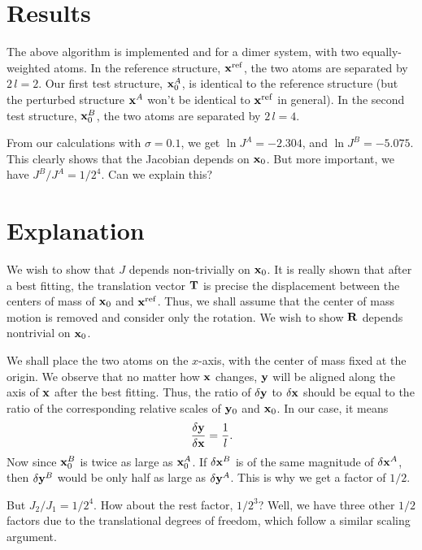 \documentclass[12pt]{article}
\begin{document}
\section{Results}



The above algorithm is implemented and for a dimer system,
with two equally-weighted atoms.
%
In the reference structure, $\mathbf{x}^\mathrm{ref}$,
the two atoms are separated by $2 \, l = 2$.
%
Our first test structure, $\mathbf{x}_0^A$,
is identical to the reference structure
(but the perturbed structure $\mathbf{x}^A$
won't be identical to $\mathbf{x}^\mathrm{ref}$ in general).
%
In the second test structure, $\mathbf{x}_0^B$,
the two atoms are separated by $2 \, l = 4$.


From our calculations with $\sigma = 0.1$,
we get $\ln J^A = -2.304$, and $\ln J^B = -5.075$.
%
This clearly shows that the Jacobian depends on $\mathbf{x}_0$.
But more important, we have
$J^B/J^A = 1/2^4$.
%
Can we explain this?




\section{Explanation}



We wish to show that $J$ depends non-trivially on $\mathbf{x}_0$.
%
It is really shown that after a best fitting,
the translation vector $\mathbf{T}$
is precise the displacement between
the centers of mass of $\mathbf{x}_0$ and $\mathbf{x}^\mathrm{ref}$.
%
Thus, we shall assume that the center of mass motion
is removed and consider only the rotation.
%
We wish to show $\mathbf{R}$ depends nontrivial on $\mathbf{x}_0$.



We shall place the two atoms on the $x$-axis,
with the center of mass fixed at the origin.
%
We observe that no matter how $\mathbf{x}$ changes,
$\mathbf{y}$ will be aligned along the axis of $\mathbf{x}$
after the best fitting.
%
Thus, the ratio of $\delta \mathbf{y}$ to $\delta \mathbf{x}$
should be equal to the ratio of
the corresponding relative scales
of $\mathbf{y}_0$ and $\mathbf{x}_0$.
%
In our case,
it means
%
\[
  \frac { \delta \mathbf{y} } { \delta \mathbf{x} }
  = \frac { 1 } { l }.
\]
%
Now since $\mathbf{x}_0^B$ is twice as large as $\mathbf{x}_0^A$.
If $\delta \mathbf{x}^B$ is of the same magnitude of $\delta \mathbf{x}^A$,
then $\delta \mathbf{y}^B$ would be only half as large as $\delta \mathbf{y}^A$.
%
This is why we get a factor of $1/2$.



But $J_2/ J_1 = 1/2^4$.
%
How about the rest factor, $1/2^3$?
%
Well, we have three other $1/2$ factors
due to the translational degrees of freedom,
which follow a similar scaling argument.
\end{document}
